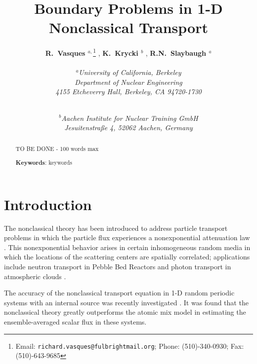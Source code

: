 \documentclass[12pt]{article}
\newcommand{\Keywords}[1]{\vspace{12pt}\par\noindent
{\small{\bf Keywords\/}: #1}}
\begin{document}
\title{Boundary Problems in 1-D Nonclassical Transport}

\author{{\bf R.\ Vasques $^{a,}$}\footnote{Email: \texttt{richard.vasques@fulbrightmail.org}; Phone: (510)-340-0930; Fax: (510)-643-9685} , {\bf K.\ Krycki $^{b}$} , {\bf R.N.\ Slaybaugh $^{a}$}\\ \\
\em {\bf $^a$}University of California, Berkeley\\
\em Department of Nuclear Engineering\\
\em 4155 Etcheverry Hall, Berkeley, CA 94720-1730\\
\and \\
\em {\bf $^b$}Aachen Institute for Nuclear Training GmbH \\
\em Jesuitenstraße 4, 52062 Aachen, Germany}
\date{}

\rhead{\runtitle}
\lhead{}
\pagestyle{fancy}
\makeatletter
\let\runtitle\@title
\makeatother

\maketitle

\begin{abstract}

TO BE DONE - 100 words max

\Keywords{keywords}
\end{abstract}

\doublespacing


\section{Introduction}\label{sec1}

The nonclassical theory has been introduced to address particle transport problems in which the particle flux experiences a nonexponential
attenuation law \citep{lar07,fra10,larvas11,vaslar14a}. This nonexponential behavior arises in certain inhomogeneous random media in which the locations of the scattering centers are spatially correlated; applications include neutron transport in Pebble Bed Reactors \citep{vaslar09,vas13,vaslar14b} and photon transport in atmospheric clouds \citep{kry13}.

The accuracy of the nonclassical transport equation in 1-D random periodic systems with an internal source was recently investigated \citep{mc15, nse16}.
It was found that the nonclassical theory greatly outperforms the atomic mix model in estimating the ensemble-averaged scalar flux in these systems.
\end{document}

